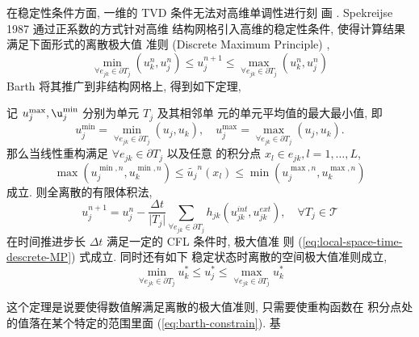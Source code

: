 在稳定性条件方面, 一维的 TVD 条件无法对高维单调性进行刻
画 \cite{LeVeque1992a}.  Spekreijse 1987 通过正系数的方式针对高维
结构网格引入高维的稳定性条件, 使得计算结果满足下面形式的离散极大值
准则 (Discrete Maximum Principle) \cite{spekreijse1987},
\begin{equation}
  \label{eq:local-space-time-descrete-MP}
  \min_{\forall e_{jk}\in \partial T_{j}} \left(
    u_{k}^{n}, u_{j}^{n}
  \right)
  \le u_{j}^{n+1} \le \max_{\forall
    e_{jk}\in \partial T_{j}} \left(
    u_{k}^{n}, u_{j}^{n}
  \right)
\end{equation}
Barth \cite{Barth1989} 将其推广到非结构网格上, 得到如下定理,
\begin{theorem}
  记 $u_{j}^{\max}, \u_{j}^{\min}$ 分别为单元 $T_{j}$ 及其相邻单
  元的单元平均值的最大最小值, 即
  \begin{equation}
    \label{eq:barth-max-min-value-def}
    u_{j}^{\min} = \min_{\forall e_{jk}\in \partial T_{j}} \left(
      u_{j},u_{k} \right),
    \quad
    u_{j}^{\max} = \max_{\forall e_{jk}\in \partial T_{j}} \left(
      u_{j},u_{k}
    \right).
  \end{equation}
  那么当线性重构满足 $\forall e_{jk}\in \partial T_{j}$ 以及任意
  的积分点 $x_{l} \in e_{jk}, l = 1, \ldots, L$,
  \begin{equation}
    \label{eq:barth-constrain}
    \max\left( u_{j}^{\min,n}, u_{k}^{\min,n} \right) \le \tilde{u_{j}}^{n}
    \left( x_{l} \right) \le \min \left( u_{j}^{\max,n}, u_{k}^{\max,n} \right)
  \end{equation}
  成立. 则全离散的有限体积法,
  \begin{equation}
    \label{eq:fully-discrete-fvm}
    u_{j}^{n+1} = u_{j}^{n} - \frac{\Delta t}{\vert T_{j} \vert}
    \sum_{\forall e_{jk}\in \partial T_{j}} h_{jk} \left(
      u_{jk}^{int}, u_{jk}^{ext} \right), \quad \forall T_{j} \in
    \mathcal{T}
  \end{equation}
  在时间推进步长 $\Delta t$ 满足一定的 CFL 条件时, 极大值准
  则 (\ref{eq:local-space-time-descrete-MP}) 式成立. 同时还有如下
  稳定状态时离散的空间极大值准则成立,
  \begin{equation}
    \label{eq:local-spatial-maximum-principle}
    \min_{\forall e_{jk}\in \partial T_{j}} u_{k}^{*} \le
    u_{j}^{*} \le \max_{\forall e_{jk}\in \partial T_{j}} u_{k}^{*}
  \end{equation}
\end{theorem}
这个定理是说要使得数值解满足离散的极大值准则, 只需要使重构函数在
积分点处的值落在某个特定的范围里面 (\ref{eq:barth-constrain}). 基
